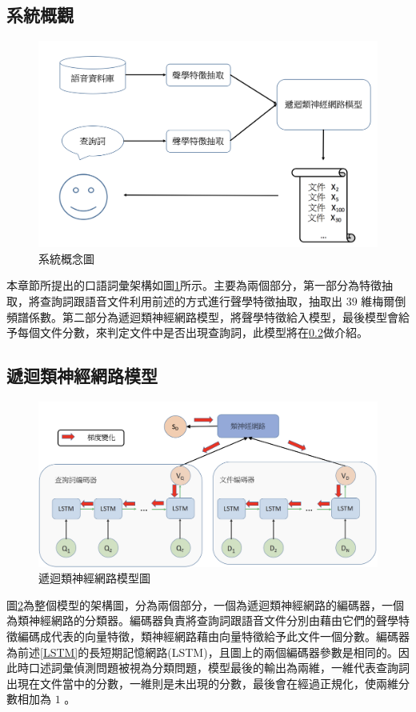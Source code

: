 \subsection{系統概觀}
\begin{figure}[h]
\centering
\includegraphics[scale=0.4]{images/ch3_system.png} 
\caption{系統概念圖}
\label{ch3_system}
\end{figure}
本章節所提出的口語詞彙架構如圖\ref{ch3_system}所示。主要為兩個部分，第一部分為特徵抽取，將查詢詞跟語音文件利用前述的方式進行聲學特徵抽取，抽取出 $ 39 $ 維梅爾倒頻譜係數。第二部分為遞迴類神經網路模型，將聲學特徵給入模型，最後模型會給予每個文件分數，來判定文件中是否出現查詢詞，此模型將在\ref{rnn_model}做介紹。
\subsection{遞迴類神經網路模型}
\label{rnn_model}
\begin{figure}[ht]
\centering
\includegraphics[scale=0.4]{images/ch3_RNN_model_g.png} 
\caption{遞迴類神經網路模型圖}
\label{ch3_RNN_model}
\end{figure}
圖\ref{ch3_RNN_model}為整個模型的架構圖，分為兩個部分，一個為遞迴類神經網路的編碼器，一個為類神經網路的分類器。編碼器負責將查詢詞跟語音文件分別由藉由它們的聲學特徵編碼成代表的向量特徵，類神經網路藉由向量特徵給予此文件一個分數。編碼器為前述\ref{LSTM}的長短期記憶網路(LSTM)，且圖上的兩個編碼器參數是相同的。因此時口述詞彙偵測問題被視為分類問題，模型最後的輸出為兩維，一維代表查詢詞出現在文件當中的分數，一維則是未出現的分數，最後會在經過正規化，使兩維分數相加為 $ 1 $ 。

